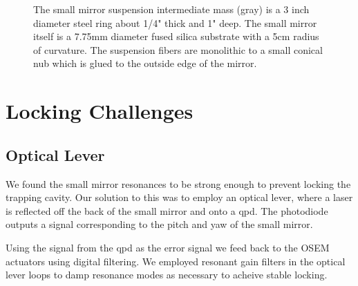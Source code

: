 \begin{figure}[hb]
\centering
{}
\caption[Small Mirror Suspension]{The small mirror suspension intermediate
         mass (gray) is a 3 inch diameter steel ring about 1/4" thick and 1"
         deep. The small mirror itself is a 7.75mm diameter fused silica
         substrate with a 5cm radius of curvature. The suspension fibers are
         monolithic to a small conical nub which is glued to the outside edge
         of the mirror.}
\label{fig:smallsus}
\end{figure}



\section{Locking Challenges}

\subsection{Optical Lever}
We found the small mirror resonances to be strong enough to prevent locking the
trapping cavity. Our solution to this was to employ an optical lever, where a
laser is reflected off the back of the small mirror and onto a \ac{qpd}.
The photodiode outputs a signal corresponding to the pitch and yaw
of the small mirror.

Using the signal from the \ac{qpd} as the error signal we feed back to the
OSEM actuators using digital filtering.
We employed resonant gain filters in the optical lever loops to damp resonance
modes as necessary to acheive stable locking.

